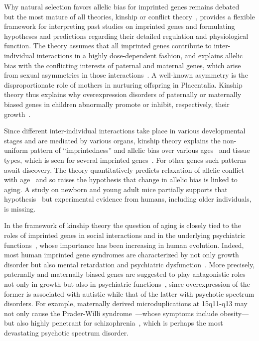 \documentclass[12pt,letterpaper]{article}
\begin{document}
Why natural selection favors allelic bias for imprinted genes remains
debated~\cite{Wilkins2003,McDonald2005,Keverne2015} but the most mature of all
theories, kinship or conflict theory~\cite{Wilkins2003}, provides a flexible
framework for interpreting past studies on imprinted genes and formulating
hypotheses and predictions regarding their detailed regulation and
physiological function.  The theory assumes that all imprinted genes contribute to
inter-individual interactions in a highly dose-dependent fashion, and explains
allelic bias with the conflicting interests of paternal and maternal genes,
which arise from sexual asymmetries in those interactions~\cite{Wilkins2003}.
A well-known asymmetry is the disproportionate role of mothers in
nurturing offspring in Placentalia.  Kinship theory thus explains why
overexpression disorders of paternally or maternally biased genes in children
abnormally promote or inhibit, respectively, their
growth~\cite{Plasschaert2014,Peters2014}.

Since different inter-individual interactions take place in various
developmental stages and are mediated by various organs, kinship theory
explains the non-uniform pattern of ``imprintedness'' and allelic bias over
various ages~\cite{Bourke2007} and tissue types, which is seen for several
imprinted genes~\cite{Plasschaert2014,Peters2014}.  For other genes such
patterns await discovery.  The theory quantitatively predicts relaxation of
allelic conflict with age~\cite{Ubeda2012} and so raises the hypothesis that
change in allelic bias is linked to aging.  A study on newborn and young adult mice
partially supports that hypothesis~\cite{Perez2015} but experimental evidence
from humans, including older individuals, is missing.

In the framework of kinship theory the question of aging is closely tied to
the roles of imprinted genes in social interactions and in the underlying
psychiatric functions~\cite{Ubeda2012,Wilkins2003}, whose importance has been
increasing in human evolution.  Indeed, most human imprinted gene syndromes
are characterized by not only growth disorder but also mental retardation and
psychiatric dysfunction~\cite{Plasschaert2014,Peters2014}.  More precisely,
paternally and maternally biased genes are suggested to play antagonistic
roles not only in growth but also in psychiatric functions~\cite{Crespi2008a},
since overexpression of the former is associated with autistic while that of
the latter with psychotic spectrum disorders.  For example, maternally derived
microduplications at 15q11-q13 may not only cause the Prader-Willi
syndrome~\cite{Peters2014}---whose symptoms include obesity---but also highly
penetrant for schizophrenia~\cite{Ingason2011,Sullivan2012}, which is perhaps the most devastating
psychotic spectrum disorder.
\end{document}
